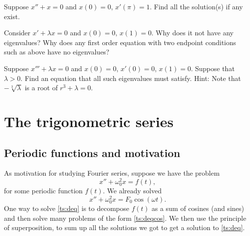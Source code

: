 \begin{exercise}
Suppose $x'' + x = 0$ and $x(0)=0$, $x'(\pi) = 1$.
Find all the solution(s) if any exist.
\end{exercise}

\begin{exercise}
Consider
$x' + \lambda x = 0$ and $x(0)=0$, $x(1) = 0$.  Why does it not
have any eigenvalues?  Why does any first order equation with two endpoint
conditions such as above have no eigenvalues?
\end{exercise}

\begin{exercise}[challenging]
Suppose $x''' + \lambda x = 0$ and $x(0)=0$, $x'(0) = 0$, $x(1) = 0$.
Suppose that $\lambda > 0$.  Find an equation that all such
eigenvalues must satisfy.
Hint: Note that $-\sqrt[3]{\lambda}$ is a root
of $r^3+\lambda = 0$.
\end{exercise}


\sectionnewpage
\section{The trigonometric series} \label{ts:section}


\subsection{Periodic functions and motivation}

As motivation for studying Fourier series, suppose we have the problem
\begin{equation} \label{ts:deq}
x'' + \omega_0^2 x = f(t) ,
\end{equation}
for some periodic function $f(t)$.
We already solved
\begin{equation} \label{ts:deqcos}
x'' + \omega_0^2 x = F_0 \cos ( \omega t) .
\end{equation}
One way to solve \eqref{ts:deq} is to
decompose $f(t)$ as a sum of cosines (and sines) and then
solve many problems of the form \eqref{ts:deqcos}.  We then use
the principle of superposition, to sum up all the solutions we got
to get a solution to \eqref{ts:deq}.

